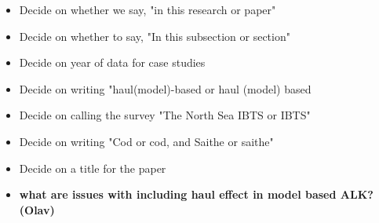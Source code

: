 \documentclass[a4paper 12pt]{article}
\numberwithin{equation}{section}
\begin{document}
\begin{itemize}
\item Decide on whether we say, "in this research or paper"
\item Decide on whether to say, "In this subsection or section"
\item Decide on year of data for case studies
\item Decide on writing "haul(model)-based or haul (model) based
\item Decide on calling the survey "The North Sea IBTS or IBTS"
\item Decide on writing "Cod or cod, and Saithe or saithe"
\item Decide on a title for the paper
\item {\bf what are issues with including haul effect in model based ALK? (Olav)}
\end{itemize}
%
%
%
\end{document}
